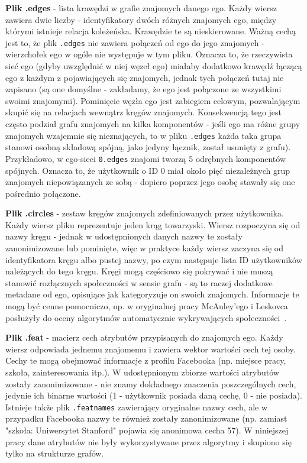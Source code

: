 \textbf{Plik .edges} - lista krawędzi w grafie znajomych danego ego. Każdy wiersz zawiera dwie liczby - identyfikatory dwóch różnych znajomych ego, między którymi istnieje relacja koleżeńska. Krawędzie te są nieskierowane. Ważną cechą jest to, że plik \verb|.edges| nie zawiera połączeń od ego do jego znajomych - wierzchołek ego w ogóle nie występuje w tym pliku. Oznacza to, że rzeczywista sieć ego (gdyby uwzględnić w niej węzeł ego) miałaby dodatkowo krawędź łączącą ego z każdym z pojawiających się znajomych, jednak tych połączeń tutaj nie zapisano (są one domyślne - zakładamy, że ego jest połączone ze wszystkimi swoimi znajomymi). Pominięcie węzła ego jest zabiegiem celowym, pozwalającym skupić się na relacjach wewnątrz kręgów znajomych. Konsekwencją tego jest często podział grafu znajomych na kilka komponentów - jeśli ego ma różne grupy znajomych wzajemnie się nieznających, to w pliku \verb|.edges| każda taka grupa stanowi osobną składową spójną, jako jedyny łącznik, został usunięty z grafu). Przykładowo, w ego-sieci \verb|0.edges| znajomi tworzą 5 odrębnych komponentów spójnych. Oznacza to, że użytkownik o ID 0 miał około pięć niezależnych grup znajomych niepowiązanych ze sobą - dopiero poprzez jego osobę stawały się one pośrednio połączone.

\textbf{Plik .circles} - zestaw kręgów znajomych zdefiniowanych przez użytkownika. Każdy wiersz pliku reprezentuje jeden krąg towarzyski. Wiersz rozpoczyna się od nazwy kręgu - jednak w udostępnionych danych nazwy te zostały zanonimizowane lub pominięte, więc w praktyce każdy wiersz zaczyna się od identyfikatora kręgu albo pustej nazwy, po czym następuje lista ID użytkowników należących do tego kręgu. Kręgi mogą częściowo się pokrywać i nie muszą stanowić rozłącznych społeczności w sensie grafu - są to raczej dodatkowe metadane od ego, opisujące jak kategoryzuje on swoich znajomych. Informacje te mogą być cenne pomocniczo, np. w oryginalnej pracy McAuley'ego i Leskovca posłużyły do oceny algorytmów automatycznie wykrywających społeczności~\cite{McAuley2012}.

\textbf{Plik .feat} - macierz cech atrybutów przypisanych do znajomych ego. Każdy wiersz odpowiada jednemu znajomemu i zawiera wektor wartości cech tej osoby. Cechy te mogą obejmować informacje z profilu Facebooka (np. miejsce pracy, szkoła, zainteresowania itp.). W udostępnionym zbiorze wartości atrybutów zostały zanonimizowane - nie znamy dokładnego znaczenia poszczególnych cech, jedynie ich binarne wartości (1 - użytkownik posiada daną cechę, 0 - nie posiada). Istnieje także plik \verb|.featnames| zawierający oryginalne nazwy cech, ale w przypadku Facebooka nazwy te również zostały zanonimizowane (np. zamiast "szkoła: Uniwersytet Stanford" pojawia się anonimowa cecha 57). W niniejszej pracy dane atrybutów nie były wykorzystywane przez algorytmy i skupiono się tylko na strukturze grafów.

